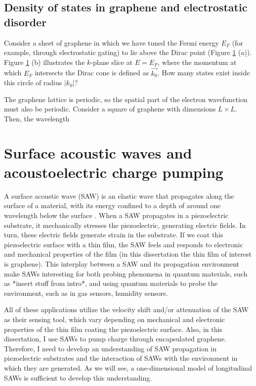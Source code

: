 \documentclass[double,12pt,1in]{beavtex}
\begin{document}

\subsection{Density of states in graphene and electrostatic disorder}
Consider a sheet of graphene in which we have tuned the Fermi energy $E_F$ (for example, through electrostatic gating) to lie above the Dirac point (Figure \ref{density of states graphic} (a)). Figure \ref{density of states graphic} (b) illustrates the $k$-plane slice at $E = E_F$, where the momentum at which $E_F$ intersects the Dirac cone is defined as $\vec{k_0}$. How many states exist inside this circle of radius $|k_0|$? 

\begin{figure}
    \caption{}
    \label{density of states graphic}
\end{figure}
The graphene lattice is periodic, so the spatial part of the electron wavefunction must also be periodic. Consider a square of graphene with dimensions $L \times L$. Then, the wavelength 


\section{Surface acoustic waves and acoustoelectric charge pumping}


A surface acoustic wave (SAW) is an elastic wave that propagates along the surface of a material, with its energy confined to a depth of around one wavelength below the surface \cite{rayleigh_waves_1885}. When a SAW propagates in a piezoelectric substrate, it mechanically stresses the piezoelectric, generating electric fields. In turn, these electric fields generate strain in the substrate. If we coat this piezoelectric surface with a thin film, the SAW feels and responds to electronic and mechanical properties of the film (in this dissertation the thin film of interest is graphene). This interplay between a SAW and its propagation environment make SAWs interesting for both probing phenomena in quantum materials, such as *insert stuff from intro*, and using quantum materials to probe the environment, such as in gas sensors, humidity sensors.

All of these applications utilize the velocity shift and/or attenuation of the SAW as their sensing tool, which vary depending on mechanical and electronic properties of the thin film coating the piezoelectric surface. Also, in this dissertation, I use SAWs to pump charge through encapsulated graphene. Therefore, I need to develop an understanding of SAW propagation in piezoelectric substrates and the interaction of SAWs with the environment in which they are generated. As we will see, a one-dimensional model of longitudinal SAWs is sufficient to develop this understanding. 
\end{document}
